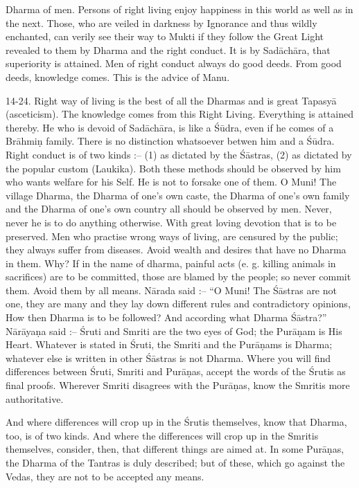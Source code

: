 Dharma of men. Persons of right living enjoy happiness in this world as well as in the next. Those, who are veiled in darkness by Ignorance and thus wildly enchanted, can verily see their way to Mukti if they follow the Great Light revealed to them by Dharma and the right conduct. It is by Sad\=ach\=ara, that superiority is attained. Men of right conduct always do good deeds. From good deeds, knowledge comes. This is the advice of Manu.

14-24. Right way of living is the best of all the Dharmas and is great Tapasy\=a (asceticism). The knowledge comes from this Right Living. Everything is attained thereby. He who is devoid of Sad\=ach\=ara, is like a \'S\=udra, even if he comes of a Br\=ahmi\d{n} family. There is no distinction whatsoever betwen him and a \'S\=udra. Right conduct is of two kinds :-- (1) as dictated by the \'S\=astras, (2) as dictated by the popular custom (Laukika). Both these methods should be observed by him who wants welfare for his Self. He is not to forsake one of them. O Muni! The village Dharma, the Dharma of one's own caste, the Dharma of one's own family and the Dharma of one's own country all should be observed by men. Never, never he is to do anything otherwise. With great loving devotion that is to be preserved. Men who practise wrong ways of living, are censured by the public; they always suffer from diseases. Avoid wealth and desires that have no Dharma in them. Why? If in the name of dharma, painful acts (e. g. killing animals in sacrifices) are to be committed, those are blamed by the people; so never commit them. Avoid them by all means. N\=arada said :-- ``O Muni! The \'S\=astras are not one, they are many and they lay down different rules and contradictory opinions, How then Dharma is to be followed? And according what Dharma \'S\=astra?'' N\=ar\=aya\d{n}a said :-- \'Sruti and Smriti are the two eyes of God; the Pur\=a\d{n}am is His Heart. Whatever is stated in \'Sruti, the Smriti and the Pur\=a\d{n}ams is Dharma; whatever else is written in other \'S\=astras is not Dharma. Where you will find differences between \'Sruti, Smriti and Pur\=a\d{n}as, accept the words of the \'Srutis as final proofs. Wherever Smriti disagrees with the Pur\=a\d{n}as, know the Smritis more authoritative.

And where differences will crop up in the \'Srutis themselves, know that Dharma, too, is of two kinds. And where the differences will crop up in the Smritis themselves, consider, then, that different things are aimed at. In some Pur\=a\d{n}as, the Dharma of the Tantras is duly described; but of these, which go against the Vedas, they are not to be accepted any means.

